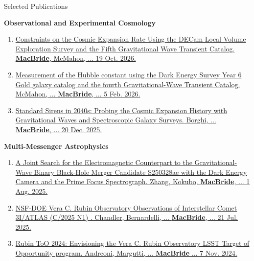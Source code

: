 \begin{rSection}{Selected Publications}
\begin{rSubsection}{\textbf{Observational and Experimental Cosmology}}{}{}{}
\begin{enumerate}
    \item \href{https://arxiv.org/abs/2610.25909}{Constraints on the Cosmic Expansion Rate Using the DECam Local Volume Exploration Survey and the Fifth Gravitational Wave Transient Catalog. \textbf{MacBride}, McMahon, ... 19 Oct. 2026.}
    \item \href{https://arxiv.org/pdf/2602.04766}{Measurement of the Hubble constant using the Dark Energy Survey Year 6 Gold galaxy catalog and the fourth Gravitational-Wave Transient Catalog. McMahon, ... \textbf{MacBride}, ... 5 Feb. 2026.}
    \item \href{https://arxiv.org/pdf/2512.18369}{Standard Sirens in 2040s: Probing the Cosmic Expansion History with Gravitational Waves and Spectroscopic Galaxy Surveys. Borghi, ... \textbf{MacBride}, ... 20 Dec. 2025.}


\end{enumerate}
\end{rSubsection}

\begin{rSubsection}{\textbf{Multi-Messenger Astrophysics}}{}{}{}
\begin{enumerate}
    \item \href{https://arxiv.org/abs/2508.00291}{A Joint Search for the Electromagnetic Counterpart to the Gravitational-Wave Binary Black-Hole Merger Candidate S250328ae with the Dark Energy Camera and the Prime Focus Spectrograph. Zhang, Kokubo, \textbf{MacBride}, ... 1 Aug. 2025.}
    \item \href{https://arxiv.org/pdf/2507.13409}{NSF-DOE Vera C. Rubin Observatory Observations of Interstellar Comet 3I/ATLAS (C/2025 N1) . Chandler, Bernardelli, ... \textbf{MacBride}, ... 21 Jul. 2025.}
    \item \href{https://arxiv.org/abs/2411.04793}{Rubin ToO 2024: Envisioning the Vera C. Rubin Observatory LSST Target of Opportunity program. Andreoni, Margutti, ... \textbf{MacBride} ... 7 Nov. 2024.}
\end{enumerate}
\end{rSubsection}


\end{rSection}
